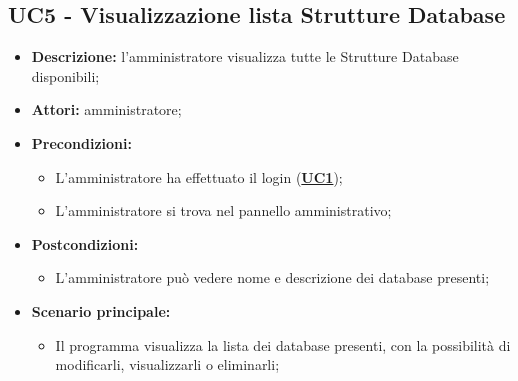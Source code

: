 \subsection{UC5 - Visualizzazione lista Strutture Database}
\label{sec:UC5}
\begin{itemize}
	\item \textbf{Descrizione:} l’amministratore visualizza tutte le Strutture Database disponibili;
	\item \textbf{Attori:} amministratore;
	\item \textbf{Precondizioni:} 
	\begin{itemize}
		\item L’amministratore ha effettuato il login (\hyperref[sec:UC1]{\textbf{UC1}});
		\item L’amministratore si trova nel pannello amministrativo;
	\end{itemize}
	\item \textbf{Postcondizioni:} 
	\begin{itemize}
		\item L'amministratore può vedere nome e descrizione dei database presenti;
	\end{itemize}
	\item \textbf{Scenario principale:} 
	\begin{itemize}
		\item Il programma visualizza la lista dei database presenti, con la possibilità di modificarli, visualizzarli o eliminarli;
	\end{itemize}
\end{itemize}

